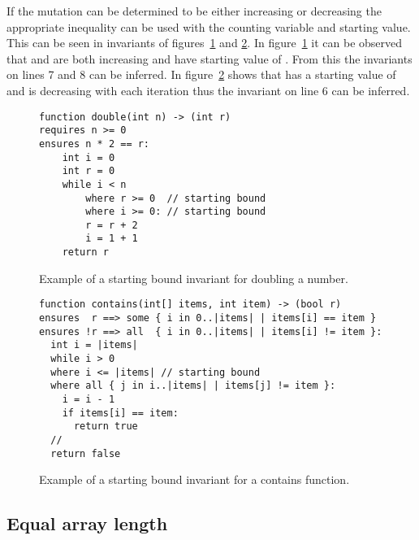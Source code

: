If the mutation can be determined to be either increasing or decreasing 
the appropriate inequality can be used with the counting variable and starting value.
This can be seen in invariants of figures~\ref{lst:starting-bound-double} and \ref{lst:starting-bound-contains}.
In figure~\ref{lst:starting-bound-double} it can be observed that  and  are both
increasing and have starting value of .
From this the invariants on lines 7 and 8 can be inferred.
In figure~\ref{lst:starting-bound-contains} shows that  has a starting value of
 and is decreasing with each iteration thus the invariant on line 6 can be inferred.


\begin{figure}[ht]
\begin{lstlisting}
function double(int n) -> (int r)
requires n >= 0
ensures n * 2 == r:
	int i = 0
	int r = 0
	while i < n
		where r >= 0  // starting bound
		where i >= 0: // starting bound
		r = r + 2
		i = 1 + 1
	return r
\end{lstlisting}
\caption{Example of a starting bound invariant for doubling a number.}
\label{lst:starting-bound-double}
\end{figure}


\begin{figure}[ht]
\begin{lstlisting}
function contains(int[] items, int item) -> (bool r)
ensures  r ==> some { i in 0..|items| | items[i] == item }
ensures !r ==> all  { i in 0..|items| | items[i] != item }:
  int i = |items|
  while i > 0
  where i <= |items| // starting bound
  where all { j in i..|items| | items[j] != item }:
    i = i - 1
    if items[i] == item:
      return true
  //
  return false
\end{lstlisting}
\caption{Example of a starting bound invariant for a contains function.}
\label{lst:starting-bound-contains}
\end{figure}

\subsection{Equal array length}

